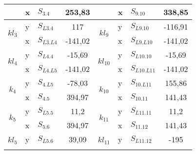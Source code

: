 \begin{table}[H]
{\begin{tabular}{|c|l|l|c|c|l|l|c|}
                        & x                               & $S_{3.4}$             & 253,83                    &                            & x          & $S_{9.10}$            & 338,85                    \\ \hline
\multirow{2}{*}{$kl_3$} & y                               & $S_{L3.4}$            & 117                       & \multirow{2}{*}{$kl_9$}    & y          & $S_{L9.10}$           & -116,91                   \\ \cline{2-4} \cline{6-8} 
                        & x                               & $S_{L3.L4}$           & -141,02                   &                            & x          & $S_{L9.L10}$          & -141,02                   \\ \hline
\multirow{2}{*}{$kl_4$} & y                               & $S_{L4.4}$            & -15,69                    & \multirow{2}{*}{$kl_{10}$} & y          & $S_{L10.10}$          & -15,69                    \\ \cline{2-4} \cline{6-8} 
                        & x                               & $S_{L4.L5}$           & -141,02                   &                            & x          & $S_{L10.L11}$         & -141,02                   \\ \hline
\multirow{2}{*}{$k_4$}  & y                               & $S_{4.L5}$            & -78,03                    & \multirow{2}{*}{$k_{10}$}  & y          & $S_{10.L11}$          & 155,86                    \\ \cline{2-4} \cline{6-8} 
                        & x                               & $S_{4.5}$             & 394,97                    &                            & x          & $S_{10.11}$           & 141,43                    \\ \hline
\multirow{2}{*}{$k_5$}  & y                               & $S_{L5.5}$            & 11,2                      & \multirow{2}{*}{$k_{11}$}  & y          & $S_{L11.11}$           & 11,2                      \\ \cline{2-4} \cline{6-8} 
                        & x                               & $S_{5.6}$             & 394,97                    &                            & x          & $S_{11.12}$          & 141,43                    \\ \hline
\multirow{2}{*}{$kl_5$} & y                               & $S_{L5.6}$            & 39,09                     & \multirow{2}{*}{$kl_{11}$} & y          & $S_{L11.12}$           & -195                      \\ \cline{2-4} \cline{6-8} 

\end{tabular}}
\end{table}
